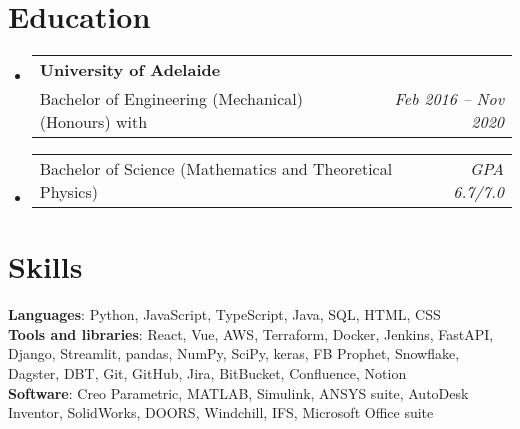 \documentclass[a4paper,11pt]{article}
\makeatletter
\newcommand{\resumeDegree}[4]{
  \vspace{-2pt}\item
    \begin{tabular*}{0.97\textwidth}[t]{l@{\extracolsep{\fill}}r}
      \textbf{#1} & #2 \\
      \small#3 & \textit{\small #4} \\
    \end{tabular*}\vspace{-7pt}
}
\newcommand{\resumeDegreePartTwo}[2]{
    \item
    \begin{tabular*}{0.97\textwidth}{l@{\extracolsep{\fill}}r}
      \small#1 & \textit{\small #2} \\
    \end{tabular*}\vspace{-7pt}
}
\newcommand{\resumeSubHeadingListStart}{\begin{itemize}[leftmargin=0.15in, label={}]}
\newcommand{\resumeSubHeadingListEnd}{\end{itemize}}
\makeatother
\begin{document}
\section{Education}
\resumeSubHeadingListStart
\resumeDegree
{University of Adelaide}{}
{Bachelor of Engineering (Mechanical)(Honours) with}{Feb 2016 -- Nov 2020}
\resumeDegreePartTwo
{Bachelor of Science (Mathematics and Theoretical Physics)}{GPA 6.7/7.0}
\resumeSubHeadingListEnd


%
\section{Skills}
\begin{itemize}[leftmargin=0.15in, label={}]
  \small{\item{
        \textbf{Languages}{:
          Python,
          JavaScript,
          TypeScript,
          Java,
          SQL,
          HTML,
          CSS
        } \\
        \textbf{Tools and libraries}{:
          React,
          Vue,
          AWS,
          Terraform,
          Docker,
          Jenkins,
          FastAPI,
          Django,
          Streamlit,
          pandas,
          NumPy,
          SciPy,
          keras,
          FB Prophet,
          Snowflake,
          Dagster,
          DBT,
          Git,
          GitHub,
          Jira,
          BitBucket,
          Confluence,
          Notion
        } \\
        \textbf{Software}{:
          Creo Parametric,
          MATLAB,
          Simulink,
          ANSYS suite,
          AutoDesk Inventor,
          SolidWorks,
          DOORS,
          Windchill,
          IFS,
          Microsoft Office suite
        } \\
        }}
\end{itemize}

\end{document}
